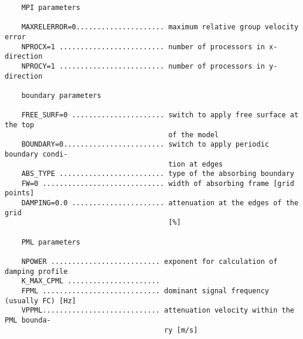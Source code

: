 \begin{verbatim}
    MPI parameters
    
    MAXRELERROR=0..................... maximum relative group velocity error
    NPROCX=1 ......................... number of processors in x-direction
    NPROCY=1 ......................... number of processors in y-direction
    
    boundary parameters
    
    FREE_SURF=0 ...................... switch to apply free surface at the top 
                                       of the model
    BOUNDARY=0........................ switch to apply periodic boundary condi- 
                                       tion at edges
    ABS_TYPE ......................... type of the absorbing boundary
    FW=0 ............................. width of absorbing frame [grid points]
    DAMPING=0.0 ...................... attenuation at the edges of the grid
                                       [%]
    
    PML parameters
    
    NPOWER .......................... exponent for calculation of damping profile
    K_MAX_CPML ...................... 
    FPML ............................ dominant signal frequency (usually FC) [Hz]
    VPPML............................ attenuation velocity within the PML bounda- 
                                      ry [m/s]
\end{verbatim}